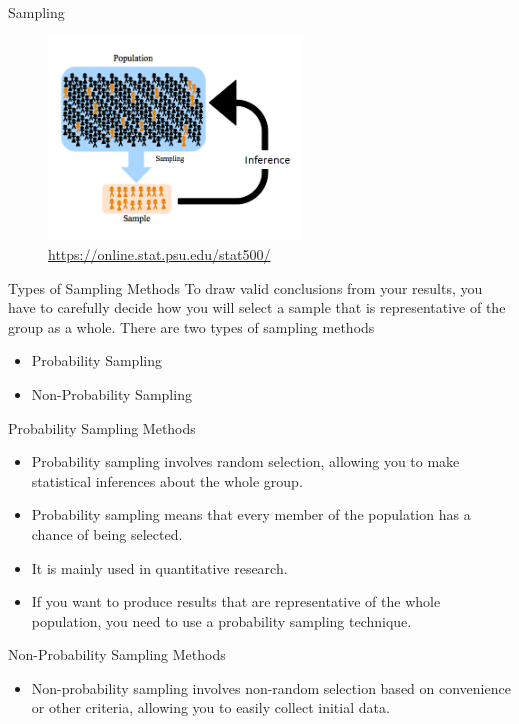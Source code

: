 \documentclass[10pt,dvipsnames, aspectratio=169]{beamer}
\begin{document}
\begin{frame}[t]{Sampling}
	\begin{figure} [ht]
		\centering
		\includegraphics[width=0.6\textwidth]{stats_img/population_sample.png}
		\caption{\url{https://online.stat.psu.edu/stat500/}}
	\end{figure}
\end{frame}

\begin{frame}[t]{Types of Sampling Methods}
	To draw valid conclusions from your results, you have to carefully decide 
	how you will select a sample that is representative of the group as a 
	whole. There are two types of sampling methods
	\begin{itemize}
		\item Probability Sampling
		\item Non-Probability Sampling 
	\end{itemize}
\end{frame}

\begin{frame}[t]{Probability Sampling Methods}
	\begin{itemize}
		\item Probability sampling involves 
		random selection, allowing you to make statistical inferences about the 
		whole group.
		\item Probability sampling means that every member of the population 
		has a chance of being selected.
		\item It is mainly used in quantitative research.
		\item If you want to produce results that are representative of the 
		whole population, you need to use a probability sampling technique.
	\end{itemize}
\end{frame}

\begin{frame}[t]{Non-Probability Sampling Methods}
	\begin{itemize}
		\item Non-probability sampling involves 
		non-random selection based on convenience or other criteria, allowing 
		you to easily collect initial data.
	\end{itemize}
\end{frame}
\end{document}
